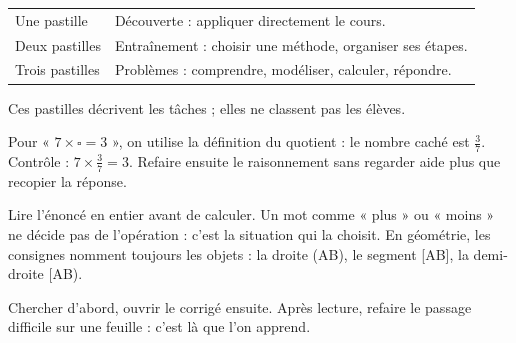 \clearpage\thispagestyle{otFront}\label{mode-emploi}\fontsize{11}{15}\selectfont

\begin{tabularx}{\linewidth}{@{}lY@{}}\toprule
Une pastille & Découverte : appliquer directement le cours.\\[3mm]
Deux pastilles & Entraînement : choisir une méthode, organiser ses étapes.\\[3mm]
Trois pastilles & Problèmes : comprendre, modéliser, calculer, répondre.\\\bottomrule
\end{tabularx}\par\medskip
Ces pastilles décrivent les tâches ; elles ne classent pas les élèves.\par\medskip
\begin{exemple}Pour « $7\times\square=3$ », on utilise la
définition du quotient : le nombre caché est $\frac37$. Contrôle :
$7\times\frac37=3$. Refaire ensuite le raisonnement sans regarder aide
plus que recopier la réponse.\end{exemple}
\begin{attention}Lire l’énoncé en entier avant de calculer. Un mot comme
« plus » ou « moins » ne décide pas de l’opération : c’est la situation
qui la choisit. En géométrie, les consignes nomment toujours les objets :
la droite (AB), le segment [AB], la demi-droite [AB).\end{attention}
Chercher d’abord, ouvrir le corrigé ensuite. Après lecture, refaire le
passage difficile sur une feuille : c’est là que l’on apprend.

\clearpage
